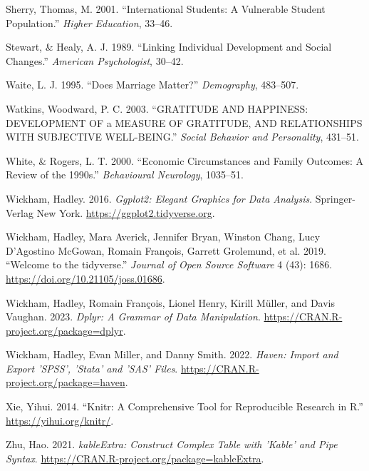 \documentclass[
  letterpaper,
  DIV=11,
  numbers=noendperiod]{scrartcl}
\newlength{\cslhangindent}
\newlength{\cslentryspacingunit} %
\newenvironment{CSLReferences}[2] %
 {%
  \setlength{\parindent}{0pt}
  \ifodd #1
  \let\oldpar\par
  \def\par{\hangindent=\cslhangindent\oldpar}
  \fi
  \setlength{\parskip}{#2\cslentryspacingunit}
 }%
 {}
\begin{document}
\begin{CSLReferences}{1}{0}
\leavevmode{}%
Sherry, Thomas, M. 2001. {``International Students: A Vulnerable Student
Population.''} \emph{Higher Education}, 33--46.

\leavevmode{}%
Stewart, \& Healy, A. J. 1989. {``Linking Individual Development and
Social Changes.''} \emph{American Psychologist}, 30--42.

\leavevmode{}%
Waite, L. J. 1995. {``Does Marriage Matter?''} \emph{Demography},
483--507.

\leavevmode{}%
Watkins, Woodward, P. C. 2003. {``GRATITUDE AND HAPPINESS: DEVELOPMENT
OF a MEASURE OF GRATITUDE, AND RELATIONSHIPS WITH SUBJECTIVE
WELL-BEING.''} \emph{Social Behavior and Personality}, 431--51.

\leavevmode{}%
White, \& Rogers, L. T. 2000. {``Economic Circumstances and Family
Outcomes: A Review of the 1990s.''} \emph{Behavioural Neurology},
1035--51.

\leavevmode{}%
Wickham, Hadley. 2016. \emph{Ggplot2: Elegant Graphics for Data
Analysis}. Springer-Verlag New York.
\url{https://ggplot2.tidyverse.org}.

\leavevmode{}%
Wickham, Hadley, Mara Averick, Jennifer Bryan, Winston Chang, Lucy
D'Agostino McGowan, Romain François, Garrett Grolemund, et al. 2019.
{``Welcome to the {tidyverse}.''} \emph{Journal of Open Source Software}
4 (43): 1686. \url{https://doi.org/10.21105/joss.01686}.

\leavevmode{}%
Wickham, Hadley, Romain François, Lionel Henry, Kirill Müller, and Davis
Vaughan. 2023. \emph{Dplyr: A Grammar of Data Manipulation}.
\url{https://CRAN.R-project.org/package=dplyr}.

\leavevmode{}%
Wickham, Hadley, Evan Miller, and Danny Smith. 2022. \emph{Haven: Import
and Export 'SPSS', 'Stata' and 'SAS' Files}.
\url{https://CRAN.R-project.org/package=haven}.

\leavevmode{}%
Xie, Yihui. 2014. {``Knitr: A Comprehensive Tool for Reproducible
Research in {R}.''} \url{https://yihui.org/knitr/}.

\leavevmode{}%
Zhu, Hao. 2021. \emph{kableExtra: Construct Complex Table with 'Kable'
and Pipe Syntax}. \url{https://CRAN.R-project.org/package=kableExtra}.

\end{CSLReferences}
\end{document}
